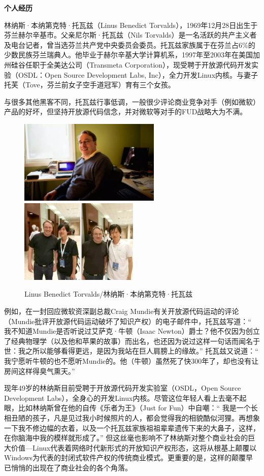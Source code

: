 \documentclass[doctor,openright,twoside]{sjtuthesis}
\theoremstyle{plain}
\theoremstyle{definition}
\theoremstyle{remark}
\theoremstyle{ocrenumbox}
\theoremstyle{plain}
\begin{document}
\textbf{个人经历}

林纳斯·本纳第克特·托瓦兹（Linus Benedict Torvalds），1969年12月28日出生于芬兰赫尔辛基市。父亲尼尔斯·托瓦兹（Nils Torvalds）是一名活跃的共产主义者及电台记者，曾当选芬兰共产党中央委员会委员。托瓦兹家族属于在芬兰占6\%的少数民族芬兰瑞典人。他毕业于赫尔辛基大学计算机系，1997年至2003年在美国加州硅谷任职于全美达公司（Transmeta Corporation），现受聘于开放源代码开发实验（OSDL：Open Source Development Labs, Inc），全力开发Linux内核。与妻子托芙（Tove，芬兰前女子空手道冠军）育有三个女孩。

与很多其他黑客不同，托瓦兹行事低调，一般很少评论商业竞争对手（例如微软）产品的好坏，但坚持开放源代码信念，并对微软等对手的FUD战略大为不满。

\begin{figure}[!htp]
  \centering
  \includegraphics[height=4cm]{images/linus.jpg}
  \hspace{1cm}
  \includegraphics[height=4cm]{images/deepin-linus.jpeg}
  \label{fig:linus}
  \caption{Linus Benedict Torvalds/林纳斯·本纳第克特·托瓦兹}
\end{figure}

例如，在一封回应微软资深副总裁Craig Mundie有关开放源代码运动的评论（Mundie批评开放源代码运动破坏了知识产权）的电子邮件中，托瓦兹写道：`` 我不知道Mundie是否听说过艾萨克·牛顿（Isaac Newton）爵士？他不仅因为创立了经典物理学（以及他和苹果的故事）而出名，也还因为说过这样一句话而闻名于世：我之所以能够看得更远，是因为我站在巨人肩膀上的缘故。'' 托瓦兹又说道：`` 我宁愿听牛顿的也不愿听Mundie的。他（牛顿）虽然死了快300年了，却也没有让房间这样得臭气熏天。''

现年49岁的林纳斯目前受聘于开放源代码开发实验室（OSDL，Open Source Development Labs），全身心的开发Linux内核。尽管这位年轻人看上去毫不起眼，比如林纳斯曾在他的自传《乐者为王》（Just for Fun）中自嘲：`` 我是一个长相丑陋的孩子，凡是见过我小时候照片的人，都会觉得我的相貌酷似河狸。再想象一下我不修边幅的衣着，以及一个托瓦兹家族祖祖辈辈遗传下来的大鼻子，这样，在你脑海中我的模样就形成了。'' 但这丝毫也影响不了林纳斯对整个商业社会的巨大价值---Linux代表着网络时代新形式的开放知识产权形态，这将从根基上颠覆以Windows为代表的封闭式软件产权的传统商业模式。更重要的是，这样的颠覆早已悄悄的出现在了商业社会的各个角落。
\end{document}
